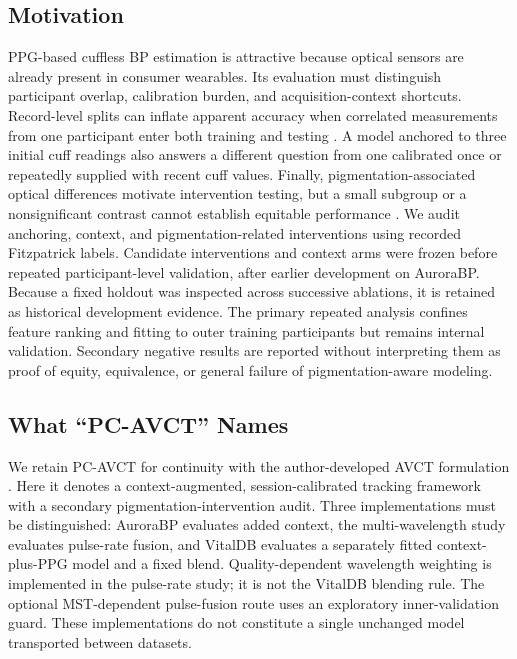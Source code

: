 \documentclass[journal]{IEEEtran}
\begin{document}
\subsection{Motivation}
PPG-based cuffless BP estimation is attractive because optical sensors are already present in consumer wearables. Its evaluation must distinguish participant overlap, calibration burden, and acquisition-context shortcuts. Record-level splits can inflate apparent accuracy when correlated measurements from one participant enter both training and testing \cite{bpbenchmark2023}. A model anchored to three initial cuff readings also answers a different question from one calibrated once or repeatedly supplied with recent cuff values. Finally, pigmentation-associated optical differences motivate intervention testing, but a small subgroup or a nonsignificant contrast cannot establish equitable performance \cite{fitzpatrick2024,jmir2024,phantom2026}.
We audit anchoring, context, and pigmentation-related interventions using recorded Fitzpatrick labels. Candidate interventions and context arms were frozen before repeated participant-level validation, after earlier development on AuroraBP. Because a fixed holdout was inspected across successive ablations, it is retained as historical development evidence. The primary repeated analysis confines feature ranking and fitting to outer training participants but remains internal validation. Secondary negative results are reported without interpreting them as proof of equity, equivalence, or general failure of pigmentation-aware modeling.
\subsection{What ``PC-AVCT'' Names}
We retain PC-AVCT for continuity with the author-developed AVCT formulation \cite{avct2026}. Here it denotes a context-augmented, session-calibrated tracking framework with a secondary pigmentation-intervention audit. Three implementations must be distinguished: AuroraBP evaluates added context, the multi-wavelength study evaluates pulse-rate fusion, and VitalDB evaluates a separately fitted context-plus-PPG model and a fixed blend. Quality-dependent wavelength weighting is implemented in the pulse-rate study; it is not the VitalDB blending rule. The optional MST-dependent pulse-fusion route uses an exploratory inner-validation guard. These implementations do not constitute a single unchanged model transported between datasets.
\end{document}
